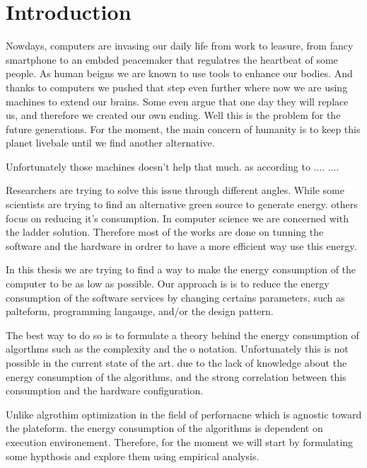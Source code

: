 \newpage
\chapter{Introduction}
\label{chapter:introduction}

Nowdays, computers are invasing our daily life from work to leasure, from fancy smartphone to an embded peacemaker that regulatres the heartbeat of some people. As human beigns we are known to use tools to enhance our bodies. And thanks to computers we pushed that step even further where now we are using machines to extend our brains. Some even argue that one day they will replace us, and therefore we created our own ending. Well this is the problem for the future generations. For the moment, the main concern of humanity is to keep this planet livebale until we find another alternative.

Unfortunately those machines doesn't help that much. as according to .... ....


Researchers are trying to solve this issue through different angles.
While some scientists are trying to find an alternative green source to generate energy. others focus on reducing it's consumption. In computer science we are concerned with the ladder solution.  Therefore most of the works are done on tunning the software and the hardware in ordrer to have a more efficient way use this energy.

In this thesis we are trying to find a way to make the energy consumption of the computer to be as low as possible.
Our approach is is to reduce the energy consumption of the software services by changing certains parameters, such as palteform, programming langauge, and/or the design pattern.

The best way to do so is to formulate a theory behind the energy consumption of algorthms such as the complexity and the o notation.
Unfortunately this is not possible in the current state of the art. due to the lack of knowledge about the energy consumption of the algorithms, and the strong correlation between this consumption and the hardware configuration.

Unlike algrothim optimization in the field of perfornacne which is agnostic toward the plateform. the energy consumption of the algorithms is dependent on execution environement.
Therefore, for the moment we will start by formulating some hypthosis and explore them using empirical analysis.

